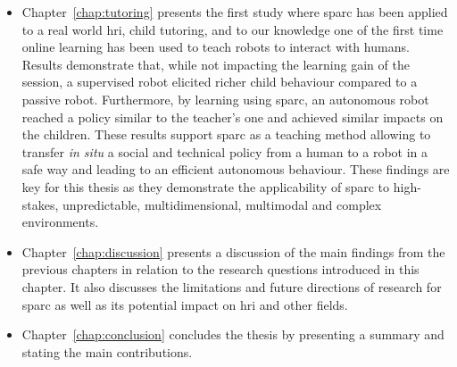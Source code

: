\begin{itemize}
	\item Chapter~\ref{chap:tutoring} presents the first study where \gls{sparc} has been applied to a real world \gls{hri}, child tutoring, and to our knowledge one of the first time online learning has been used to teach robots to interact with humans. Results demonstrate that, while not impacting the learning gain of the session, a supervised robot elicited richer child behaviour compared to a passive robot. Furthermore, by learning using \gls{sparc}, an autonomous robot reached a policy similar to the teacher's one and achieved similar impacts on the children. These results support \gls{sparc} as a teaching method allowing to transfer \textit{in situ} a social and technical policy from a human to a robot in a safe way and leading to an efficient autonomous behaviour. These findings are key for this thesis as they demonstrate the applicability of \gls{sparc} to high-stakes, unpredictable, multidimensional, multimodal and complex environments.
	
	\item Chapter~\ref{chap:discussion} presents a discussion of the main findings from the previous chapters in relation to the research questions introduced in this chapter. It also discusses the limitations and future directions of research for \gls{sparc} as well as its potential impact on \gls{hri} and other fields.

	\item Chapter~\ref{chap:conclusion} concludes the thesis by presenting a summary and stating the main contributions.
	
\end{itemize}
